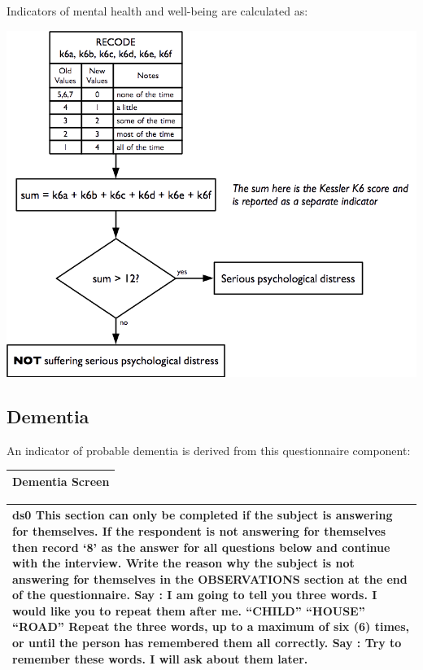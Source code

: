 \documentclass[12pt,a4paper]{book}
\theoremstyle{definition}
\theoremstyle{definition}
\theoremstyle{definition}
\theoremstyle{remark}
\begin{document}
Indicators of mental health and well-being are calculated as:

\begin{center}\includegraphics[width=800pt]{figures/indicators19} \end{center}

\hypertarget{dementia}{%
\subsection{Dementia}\label{dementia}}

An indicator of probable dementia is derived from this questionnaire
component:

\begin{longtable}[]{@{}c@{}}
\toprule
\begin{minipage}[t]{0.97\columnwidth}\centering
\textbf{Dementia Screen}\strut
\end{minipage}\tabularnewline
\bottomrule
\end{longtable}

\begin{longtable}[]{@{}l@{}}
\toprule
\begin{minipage}[t]{0.97\columnwidth}\raggedright
ds0 \textbar{} This section can only be completed if the subject is
answering for themselves. \textbar{} \textbar{} If the respondent is not
answering for themselves then record `8' as the answer for all
\textbar{} questions below and continue with the interview. Write the
reason why the subject is not \textbar{} answering for themselves in the
OBSERVATIONS section at the end of the questionnaire. \textbar{}
\textbar{} Say : \textbar{} \textbar{} I am going to tell you three
words. \textbar{} \textbar{} I would like you to repeat them after me.
\textbar{} \textbar{} ``CHILD'' \textbar{} \textbar{} ``HOUSE''
\textbar{} \textbar{} ``ROAD'' \textbar{} \textbar{} Repeat the three
words, up to a maximum of six (6) times, or until the person has
\textbar{} remembered them all correctly. \textbar{} \textbar{} Say :
\textbar{} \textbar{} Try to remember these words. I will ask about them
later.\strut
\end{minipage}\tabularnewline
\bottomrule
\end{longtable}
\end{document}
